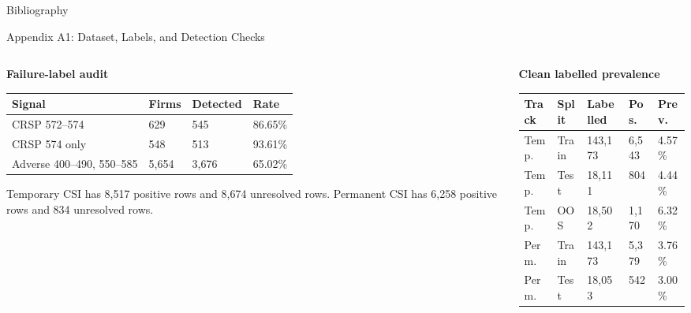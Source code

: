 \documentclass[10pt]{beamer}\usepackage[]{graphicx}\usepackage[table]{xcolor}
\begin{document}

\begin{frame}[allowframebreaks]{Bibliography}





\end{frame}



\begin{frame}{Appendix A1: Dataset, Labels, and Detection Checks}
\scriptsize
\begin{columns}[T,onlytextwidth]
\begin{column}{0.49\textwidth}
\textbf{Failure-label audit}
\vspace{0.15em}
\begin{table}[ht]
\centering
\setlength{\tabcolsep}{2.2pt}
\begin{tabular}{L{2.75cm}R{1.0cm}R{0.95cm}R{1.0cm}}
\toprule
Signal & Firms & Detected & Rate \\
\midrule
CRSP 572--574 & 629 & 545 & 86.65\% \\
CRSP 574 only & 548 & 513 & 93.61\% \\
Adverse 400--490, 550--585 & 5,654 & 3,676 & 65.02\% \\
\bottomrule
\end{tabular}
\end{table}
\vspace{0.25em}
Temporary CSI has 8,517 positive rows and 8,674 unresolved rows. Permanent CSI has 6,258 positive rows and 834 unresolved rows.
\end{column}
\begin{column}{0.49\textwidth}
\textbf{Clean labelled prevalence}
\vspace{0.15em}
\begin{table}[ht]
\centering
\setlength{\tabcolsep}{2.0pt}
\begin{tabular}{L{1.35cm}L{0.8cm}R{0.85cm}R{0.75cm}R{0.75cm}}
\toprule
Track & Split & Labelled & Pos. & Prev. \\
\midrule
Temp. & Train & 143,173 & 6,543 & 4.57\% \\
Temp. & Test & 18,111 & 804 & 4.44\% \\
Temp. & OOS & 18,502 & 1,170 & 6.32\% \\
Perm. & Train & 143,173 & 5,379 & 3.76\% \\
Perm. & Test & 18,053 & 542 & 3.00\% \\

\end{tabular}
\end{table}
\end{column}
\end{columns}
\end{frame}
\end{document}
